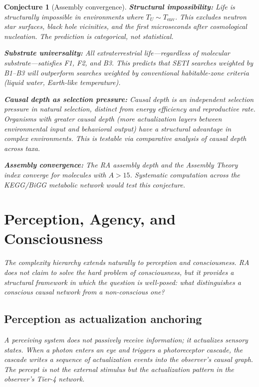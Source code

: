 \documentclass[11pt]{article}
\newtheorem{conjecture}{Conjecture}
\begin{document}
\begin{conjecture}[Assembly convergence]
\textbf{Structural impossibility:} Life is structurally impossible in environments where $T_U\sim T_{\mathrm{env}}$. This excludes neutron star surfaces, black hole vicinities, and the first microseconds after cosmological nucleation. The prediction is categorical, not statistical.

\textbf{Substrate universality:} All extraterrestrial life---regardless of molecular substrate---satisfies F1, F2, and B3. This predicts that SETI searches weighted by B1--B3 will outperform searches weighted by conventional habitable-zone criteria (liquid water, Earth-like temperature).

\textbf{Causal depth as selection pressure:} Causal depth is an independent selection pressure in natural selection, distinct from energy efficiency and reproductive rate. Organisms with greater causal depth (more actualization layers between environmental input and behavioral output) have a structural advantage in complex environments. This is testable via comparative analysis of causal depth across taxa.

\textbf{Assembly convergence:} The RA assembly depth and the Assembly Theory index converge for molecules with $A>15$. Systematic computation across the KEGG/BiGG metabolic network would test this conjecture.

\section{Perception, Agency, and Consciousness}
\label{sec:consciousness}

The complexity hierarchy extends naturally to perception and consciousness. RA does not claim to solve the hard problem of consciousness, but it provides a structural framework in which the question is well-posed: what distinguishes a conscious causal network from a non-conscious one?

\subsection{Perception as actualization anchoring}

A perceiving system does not passively receive information; it \emph{actualizes} sensory states. When a photon enters an eye and triggers a photoreceptor cascade, the cascade writes a sequence of actualization events into the observer's causal graph. The percept is not the external stimulus but the actualization pattern in the observer's Tier-4 network.


\end{conjecture}
\end{document}

